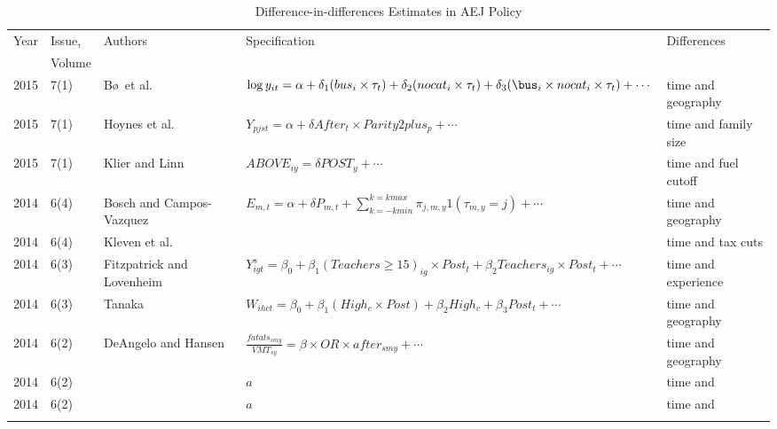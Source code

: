 \begin{landscape}
\begin{table}
\begin{center}
\caption{Difference-in-differences Estimates in AEJ Policy}
\label{Stab:AEJ}
\begin{tabular}{lllll}\toprule
Year & Issue, & Authors & Specification & Differences\\
& Volume & & \\ \midrule
2015 & 7(1) & B\o\ et al. & $\log y_{it}=\alpha + \delta_1(bus_i\times
\tau_t)+\delta_2(nocat_i\times\tau_t)+\delta_3(\bus_i\times
nocat_i\times\tau_t)+\cdots$ 
& time and geography \\

2015 & 7(1) & Hoynes et al. & $Y_{pjst} = \alpha + \delta
After_t\times Parity2plus_p + \cdots$  & time and family size \\

2015 & 7(1) & Klier and Linn & $ABOVE_{iy}=\delta POST_y + \cdots$ & time and fuel cutoff\\

2014 & 6(4) & Bosch and Campos-Vazquez & $E_{m,t}=\alpha+\delta
P_{m,t}+\sum_{k=-k min}^{k=k max}\pi_{j,m,y}1(\tau_{m,y}=j)+\cdots$ &
time and geography \\

2014 & 6(4) &Kleven et al. &  & time and tax cuts\\

2014 & 6(3) & Fitzpatrick and Lovenheim &
$Y^s_{igt}=\beta_0+\beta_1(Teachers\geq 15)_{ig}\times Post_t +
\beta_2 Teachers_{ig}\times Post_t+\cdots$ & time and experience \\

2014 & 6(3) & Tanaka & $W_{ihct}=\beta_0+\beta_1(High_c\times Post) +
\beta_2 High_c+\beta_3 Post_t + \cdots$ & time and geography \\

2014 & 6(2) & DeAngelo and Hansen &
$\frac{fatals_{smy}}{VMT_{sy}}=\beta\times OR \times
after_{smy}+\cdots$ & time and geography \\

2014 & 6(2) & & $a$ & time and  \\

2014 & 6(2) & & $a$ & time and  \\

& & & & \\ \bottomrule
\end{tabular}
\end{center}
\end{table}
\end{landscape}
